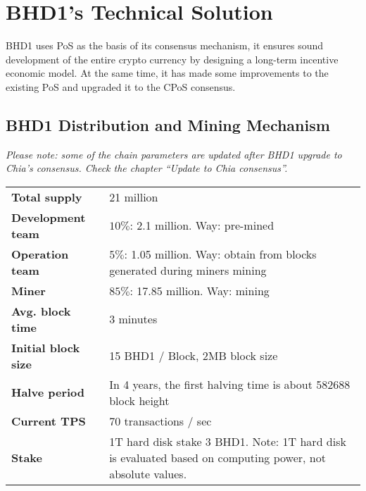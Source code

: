 \chapter{BHD1's Technical Solution}
\begin{flushleft}
    BHD1 uses PoS as the basis of its consensus mechanism, it ensures sound development of the entire crypto currency by designing a long-term incentive economic model. At the same time, it has made some improvements to the existing PoS and upgraded it to the CPoS consensus.
\end{flushleft}
\section{BHD1 Distribution and Mining Mechanism}
\begin{flushleft}
    \textit{Please note: some of the chain parameters are updated after BHD1 upgrade to Chia's consensus. Check the chapter ``Update to Chia consensus''.}
\end{flushleft}
\begin{tabular}{ p{4cm} p{8cm} }
    \hline
    \textbf{Total supply}                           & 21 million                                                                                               \\[5pt]
    \rowcolor{lightgray!30}\textbf{Development team}   & $10\%$: 2.1 million. Way: pre-mined                                                                      \\[5pt]
    \textbf{Operation team}                         & $5\%$: 1.05 million. Way: obtain from blocks generated during miners mining                              \\[5pt]
    \rowcolor{lightgray!30}\textbf{Miner}              & $85\%$: 17.85 million. Way: mining                                                                       \\[5pt]
    \textbf{Avg. block time}                        & 3 minutes                                                                                                \\[5pt]
    \rowcolor{lightgray!30}\textbf{Initial block size} & 15 BHD1 / Block, 2MB block size                                                                           \\[5pt]
    \textbf{Halve period}                           & In 4 years, the first halving time is about 582688 block height                                          \\[5pt]
    \rowcolor{lightgray!30}\textbf{Current TPS}        & 70 transactions / sec                                                                                    \\[5pt]
    \textbf{Stake}                                  & 1T hard disk stake 3 BHD1. Note: 1T hard disk is evaluated based on computing power, not absolute values. \\[5pt]
    \hline
\end{tabular}
